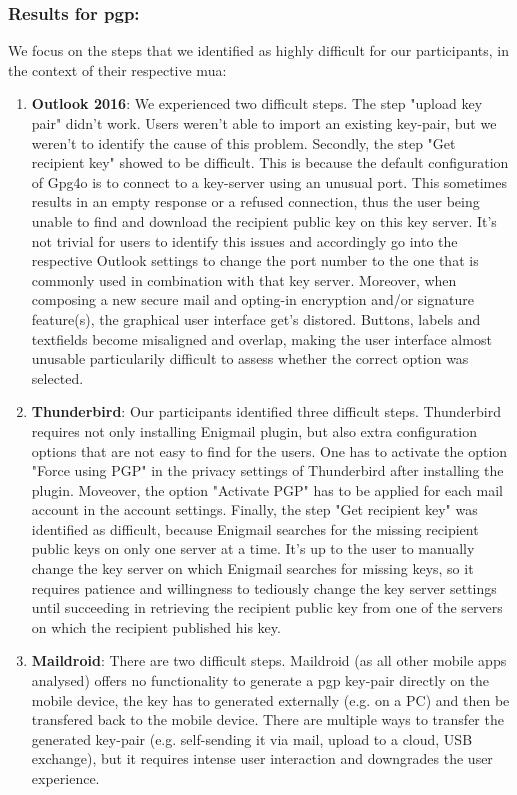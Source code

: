 \subsubsection{Results for \acrshort{pgp}:}
We focus on the steps that we identified as highly difficult for our participants, in the context of their respective \acrshort{mua}:
\begin{enumerate}
	\item \textbf{Outlook 2016}: We experienced two difficult steps. The step "upload key pair" didn't work. Users weren't able to import an existing key-pair, but we weren't to identify the cause of this problem. Secondly, the step "Get recipient key" showed to be difficult. This is because the default configuration of Gpg4o is to connect to a key-server using an unusual port. This sometimes results in an empty response or a refused connection, thus the user being unable to find and download the recipient public key on this key server. It's not trivial for users to identify this issues and accordingly go into the respective Outlook settings to change the port number to the one that is commonly used in combination with that key server. Moreover, when composing a new secure mail and opting-in encryption and/or signature feature(s), the graphical user interface get's distored. Buttons, labels and textfields become misaligned and overlap, making the user interface almost unusable particularily difficult to assess whether the correct option was selected.
	\item \textbf{Thunderbird}: Our participants identified three difficult steps. Thunderbird requires not only installing Enigmail plugin, but also extra configuration options that are not easy to find for the users. One has to activate the option "Force using PGP" in the privacy settings of Thunderbird after installing the plugin. Moveover, the option "Activate PGP" has to be applied for each mail account in the account settings. Finally, the step "Get recipient key" was identified as difficult, because Enigmail searches for the missing recipient public keys on only one server at a time. It's up to the user to manually change the key server on which Enigmail searches for missing keys, so it requires patience and willingness to tediously change the key server settings until succeeding in retrieving the recipient public key from one of the servers on which the recipient published his key.
	\item \textbf{Maildroid}: There are two difficult steps. Maildroid (as all other mobile apps analysed) offers no functionality to generate a \acrshort{pgp} key-pair directly on the mobile device, the key has to generated externally (e.g. on a PC) and then be transfered back to the mobile device. There are multiple ways to transfer the generated key-pair (e.g. self-sending it via mail, upload to a cloud, USB exchange), but it requires intense user interaction and downgrades the user experience.
\end{enumerate}
